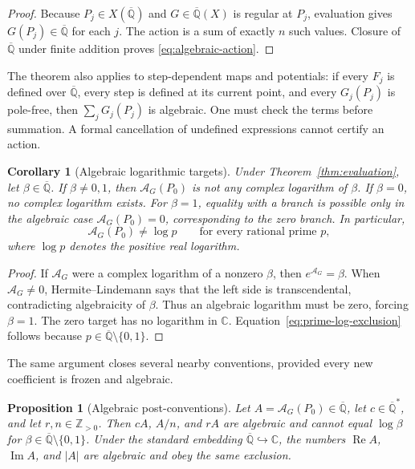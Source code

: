\documentclass[11pt]{article}
\newtheorem{corollary}[theorem]{Corollary}
\newtheorem{proposition}[theorem]{Proposition}
\theoremstyle{definition}
\theoremstyle{remark}
\newcommand{\C}{\mathbb C}
\newcommand{\Qbar}{\overline{\mathbb Q}}
\newcommand{\Z}{\mathbb Z}
\newcommand{\Action}{\mathcal A}
\begin{document}
\begin{proof}
Because $P_j\in X(\Qbar)$ and $G\in\Qbar(X)$ is regular at $P_j$, evaluation
gives $G(P_j)\in\Qbar$ for each $j$.  The action is a sum of exactly $n$
such values.  Closure of $\Qbar$ under finite addition proves
\eqref{eq:algebraic-action}.
\end{proof}

The theorem also applies to step-dependent maps and potentials: if every
$F_j$ is defined over $\Qbar$, every step is defined at its current point,
and every $G_j(P_j)$ is pole-free, then $\sum_jG_j(P_j)$ is algebraic.  One
must check the terms before summation.  A formal cancellation of undefined
expressions cannot certify an action.

\begin{corollary}[Algebraic logarithmic targets]
\label{cor:log-target}
Under Theorem~\ref{thm:evaluation}, let
$\beta\in\Qbar$.  If $\beta\ne0,1$, then $\Action_G(P_0)$ is not any complex
logarithm of $\beta$.  If $\beta=0$, no complex logarithm exists.  For
$\beta=1$, equality with a branch is possible only in the algebraic case
$\Action_G(P_0)=0$, corresponding to the zero branch.  In particular,
\begin{equation}
  \Action_G(P_0)\ne\log p
  \qquad\text{for every rational prime }p,
  \label{eq:prime-log-exclusion}
\end{equation}
where $\log p$ denotes the positive real logarithm.
\end{corollary}

\begin{proof}
If $\Action_G$ were a complex logarithm of a nonzero $\beta$, then
$e^{\Action_G}=\beta$.  When $\Action_G\ne0$, Hermite--Lindemann says that
the left side is transcendental, contradicting algebraicity of $\beta$.
Thus an algebraic logarithm must be zero, forcing $\beta=1$.  The zero target
has no logarithm in $\C$.  Equation~\eqref{eq:prime-log-exclusion} follows
because $p\in\Qbar\setminus\{0,1\}$.
\end{proof}

The same argument closes several nearby conventions, provided every new
coefficient is frozen and algebraic.

\begin{proposition}[Algebraic post-conventions]
\label{prop:extensions}
Let $A=\Action_G(P_0)\in\Qbar$, let $c\in\Qbar^*$, and let
$r,n\in\Z_{>0}$.  Then $cA$, $A/n$, and $rA$ are algebraic and cannot equal
$\log\beta$ for $\beta\in\Qbar\setminus\{0,1\}$.  Under the standard
embedding $\Qbar\hookrightarrow\C$, the numbers
$\operatorname{Re}A$, $\operatorname{Im}A$, and $|A|$ are algebraic and
obey the same exclusion.
\end{proposition}
\end{document}
